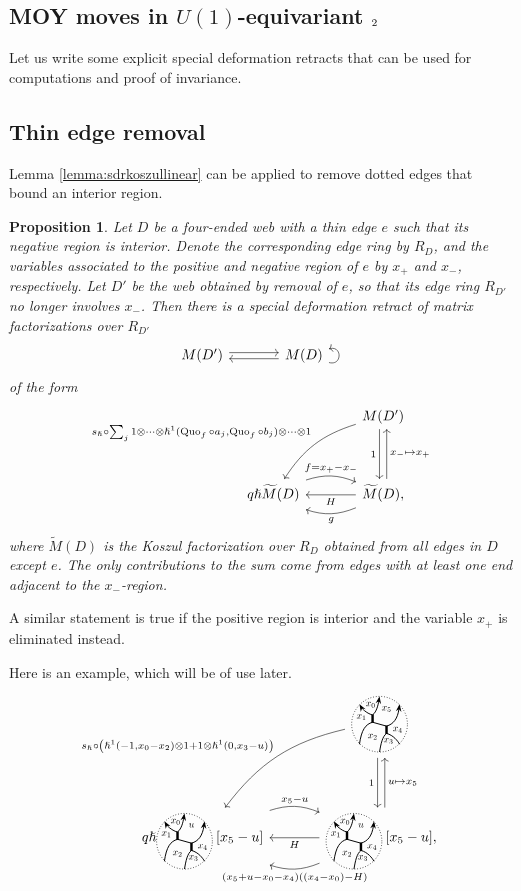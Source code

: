\documentclass{article}
\newcommand{\uone}{U(1)}
\DeclareMathOperator{\Quo}{Quo}
\newcommand{\sdr}[5]{%
  \begin{tikzcd}[column sep=large, ampersand replacement=\&]
    {#1} \arrow[r, "#3", shift left=0.5ex,] \arrow[r, leftarrow, "#4", shift right=0.5ex, swap] \& 
    {#2} \arrow[loop right, distance=1em, in=15, out=-15, "#5",swap]
  \end{tikzcd}%
}
\theoremstyle{plain} %
\newtheorem{proposition}[theorem]{Proposition}
\theoremstyle{definition} %
\theoremstyle{remark} %
\begin{document}


\subsection{MOY moves in $\uone$-equivariant $\sl_2$}

Let us write some explicit special deformation retracts that can be used for computations and proof of invariance. 

\subsection{Thin edge removal}
Lemma \ref{lemma:sdrkoszullinear} can be applied to remove dotted edges that bound an interior region.
\begin{proposition}
Let $D$ be a four-ended web with a thin edge $e$ such that its negative region is interior. Denote the corresponding edge ring by $R_D$, and the variables associated to the positive and negative region of $e$ by $x_+$ and $x_-$, respectively. Let $D'$ be the web obtained by removal of $e$, so that its edge ring $R_{D'}$ no longer involves $x_-$. Then there is a special deformation retract of matrix factorizations over $R_{D'}$
$$\sdr{M(D')}{M(D)}{}{}{}$$ 
of the form
 $$\begin{tikzcd}[column sep=large, ]
    &M(D')\ar[dd, shift right=0.6ex, "1", swap]\ar[dd, leftarrow, shift left=0.6ex, "x_-\mapsto x_+"]\arrow[ddl, "{s_\hslash\circ\sum_{j}1\otimes\cdots \otimes\hslash^1(\Quo_f\circ a_j,\Quo_f\circ b_j)\otimes\cdots\otimes 1}", bend right=20, swap]\\\\
    q\hslash \widetilde M(D)\arrow[r, "f=x_+-x_-", shift left=0.5ex, bend left=20]& \widetilde M(D)\ar[l, "H"]\arrow[l, "g", shift left=0.5ex, bend left=20], 
\end{tikzcd}$$
where $\widetilde M(D)$ is the Koszul factorization over $R_D$ obtained from all edges in $D$ except $e$. The only contributions to the sum come from edges with at least one end adjacent to the $x_-$-region.
\end{proposition}

A similar statement is true if the positive region is interior and the variable $x_+$ is eliminated instead.

Here is an example, which will be of use later.
\[
\begin{tikzcd}[column sep=large, ]
    &\scalebox{0.7}{\ThickLThickRStandard} \ar[dd, shift right=0.6ex, "1", swap]\ar[dd, leftarrow, shift left=0.6ex, "u\mapsto x_5"]\arrow[ddl, "{s_\hslash\circ\left(\hslash^1(-1,x_0-x_2)\otimes 1+1\otimes\hslash^1(0,x_3-u)\right)}", bend right=20, swap]\\\\
    q\hslash \scalebox{0.7}{\ThickLThickR{x_0}{x_1}{x_2}{x_3}{x_4}{u}}[x_5-u]\arrow[r, "x_5-u", shift left=0.5ex, bend left=20]& \scalebox{0.7}{\ThickLThickR{x_0}{x_1}{x_2}{x_3}{x_4}{u}}[x_5-u]\ar[l, "H"]\arrow[l, "(x_5+u-x_0-x_4)((x_4-x_0)-H)", shift left=0.5ex, bend left=20], 
\end{tikzcd}
\]
\end{document}
